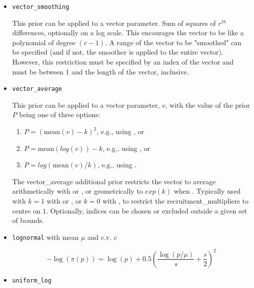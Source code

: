 \begin{itemize}
	\item \texttt{vector\_smoothing}\label{sec:AdditionalPrior-VectorSmoothing}

	This prior can be applied to a vector parameter. Sum of squares of $r^{th}$ differences, optionally on a log scale. This encourages the vector to be like a polynomial of degree $(r-1)$. A range of the vector to be "smoothed" can be specified (and if not, the smoother is applied to the entire vector). However, this restriction must be specified by an index of the vector and must be between 1 and the length of the vector, inclusive.

	\item \texttt{vector\_average}\label{sec:AdditionalPrior-VectorAverage}

	This prior can be applied to a vector parameter, $v$, with the value of the prior $P$ being one of three options: 
	\begin{enumerate} 
		\item $P=(\text{mean}(v)-k)^2$, e.g., using , or
		\item $P=\text{mean}(log(v))-k$, e.g., using , or
		\item $P=log(\text{mean}(v)/k)$, e.g., using . 
	\end{enumerate}

	The vector\_average additional prior restricts the vector to average arithmetically with  or , or geometrically to $exp(k)$ when . Typically used with $k=1$ with  or , or $k=0$ with , to restrict the recruitment\_multipliers to centre on $1$. Optionally, indices can be chosen or excluded outside a given set of bounds.

	\item\texttt{lognormal} with mean $\mu$ and c.v. $c$\label{sec:AdditionalPrior-LogNormal}

	\begin{equation}
	- \log \left(\pi \left(p \right) \right) = \log \left( p \right) + 0.5 \left( \frac{\log \left( p / \mu \right)}{s} + \frac{s}{2} \right)^2
	\end{equation}

	\item\texttt{uniform\_log}\label{sec:AdditionalPrior-UniformLog}


\end{itemize}
